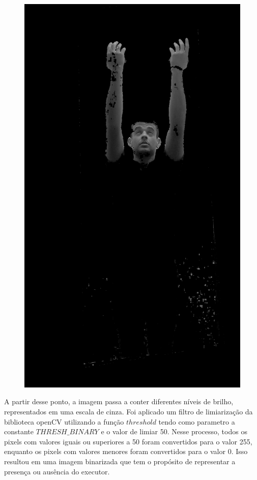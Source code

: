 \begin{figure}[H]
\begin{minipage}{\sizeImg\textwidth}
            \includegraphics[width=\textwidth]{figuras/mao_barra/gray.png}
        \end{minipage}
    \label{fig:gray}
\end{figure}

A partir desse ponto, a imagem passa a conter diferentes níveis de brilho, representados em uma escala de cinza. Foi aplicado um filtro de limiarização da biblioteca \ac{openCV} utilizando a função $threshold$ tendo como parametro a constante $THRESH\_BINARY$ e o valor de limiar 50. Nesse processo, todos os pixels com valores iguais ou superiores a 50 foram convertidos para o valor 255, enquanto os pixels com valores menores foram convertidos para o valor 0. Isso resultou em uma imagem binarizada que tem o propósito de representar a presença ou ausência do executor.

